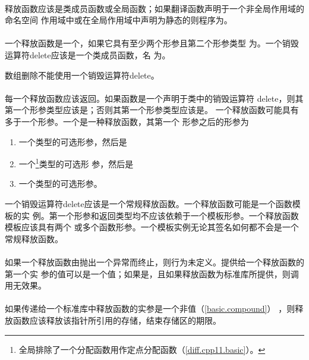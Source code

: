 \paragraph{} %
释放函数应该是类成员函数或全局函数；如果翻译函数声明于一个非全局作用域的命名空间
作用域中或在全局作用域中声明为静态的则程序为\illform{}。

\paragraph{} %
\begin{sloppypar}
一个释放函数是一个，如果它具有至少两个形参且第二个形参类型
为。一个销毁运算符delete应该是一个类成员函数，名
为。
\end{sloppypar}

\begin{note}
  数组删除不能使用一个销毁运算符delete。
\end{note}

\paragraph{} %
每一个释放函数应该返回。如果函数是一个声明于类中的销毁运算符
delete，则其第一个形参类型应该是；否则其第一个形参类型应该是。
一个释放函数可能具有多于一个形参。一个是一种释放函数，其第一个
形参之后的形参为
\begin{enumerate}
  \item 一个类型的可选形参，然后是
  \item 一个\footnote{全局排除了一个分配函数用作定点分配函数（\ref{diff.cpp11.basic}）。}类型的可选形
        参，然后是
  \item 一个类型的可选形参。
\end{enumerate}
一个销毁运算符delete应该是一个常规释放函数。一个释放函数可能是一个函数模板的实
例。第一个形参和返回类型均不应该依赖于一个模板形参。一个释放函数模板应该具有两个
或多个函数形参。一个模板实例无论其签名如何都不会是一个常规释放函数。

\paragraph{} %
如果一个释放函数由抛出一个异常而终止，则行为未定义。提供给一个释放函数的第一个实
参的值可以是一个\nullp{}值；如果是，且如果释放函数为标准库所提供，则调用无效果。

\paragraph{} %
如果传递给一个标准库中释放函数的实参是一个非\nullp{}值（\ref{basic.compound}）
，则释放函数应该释放该指针所引用的存储，结束存储区的期限。
